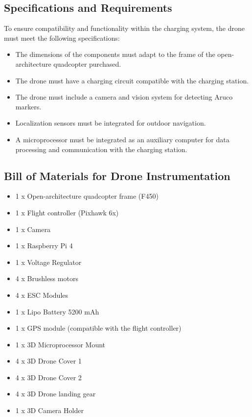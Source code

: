 \subsection{Specifications and Requirements}
To ensure compatibility and functionality within the charging system, the drone must meet the following specifications:
    \begin{itemize}
        \item The dimensions of the components must adapt to the frame of the open-architecture quadcopter purchased.
        \item The drone must have a charging circuit compatible with the charging station.
        \item The drone must include a camera and vision system for detecting Aruco markers.
        \item Localization sensors must be integrated for outdoor navigation.
        \item A microprocessor must be integrated as an auxiliary computer for data processing and communication with the charging station.
    \end{itemize}

\subsection{Bill of Materials for Drone Instrumentation}
    \begin{itemize} 
        \item 1 x Open-architecture quadcopter frame (F450)
        \item 1 x Flight controller (Pixhawk 6x) 
        \item 1 x Camera 
        \item 1 x Raspberry Pi 4 
        \item 1 x Voltage Regulator
        \item 4 x Brushless motors
        \item 4 x ESC Modules
        \item 1 x Lipo Battery 5200 mAh
        \item 1 x GPS module (compatible with the flight controller) 
        \item 1 x 3D Microprocessor Mount 
        \item 4 x 3D Drone Cover 1
        \item 4 x 3D Drone Cover 2
        \item 4 x 3D Drone landing gear
        \item 1 x 3D Camera Holder
    \end{itemize}


